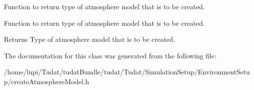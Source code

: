 Function to return type of atmosphere model that is to be created. 

Function to return type of atmosphere model that is to be created. \begin{DoxyReturn}{Returns}
Type of atmosphere model that is to be created. 
\end{DoxyReturn}


The documentation for this class was generated from the following file\+:\begin{DoxyCompactItemize}
\item 
/home/lupi/\+Tudat/tudat\+Bundle/tudat/\+Tudat/\+Simulation\+Setup/\+Environment\+Setup/create\+Atmosphere\+Model.\+h\end{DoxyCompactItemize}
